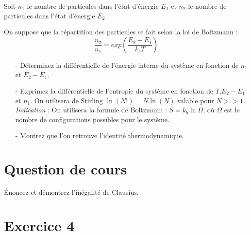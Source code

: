 \documentclass{report}
\begin{document}
Soit $n_{1}$ le nombre de particules dans l'état d'énergie $E_{1}$ et $n_{2}$ le nombre de particules dans l'état d'énergie $E_{2}$.

On suppose que la répartition des particules se fait selon la loi de Boltzmann :
\begin{equation}
\frac{n_{2}}{n_{1}}=exp\left( \frac{E_{2}-E_{1}}{k_{b}T}\right) 
\end{equation}
\begin{itemize}
\item[-]Déterminez la différentielle de l'énergie interne du système en fonction de $n_{1}$ et $E_{2}-E_{1}$.
\item[-]Exprimez la différentielle de l'entropie du système en fonction de $T$,$E_{2}-E_{1}$ et $n_{1}$. On utilisera de Stirling $\ln (N!)=N \ln (N)$ valable pour $N>>1$.
\textit{Indication} : On utilisera la formule de Boltzmann : $S=k_{b}\ln \Omega$, où $\Omega$ est le nombre de configurations possibles pour le système.
\item[-]Montrez que l'on retrouve l'identité thermodynamique.
\end{itemize}

\newpage

\section*{Question de cours}
Énoncez et démontrez l’inégalité de Clausius.

\section*{Exercice 4}
\end{document}
